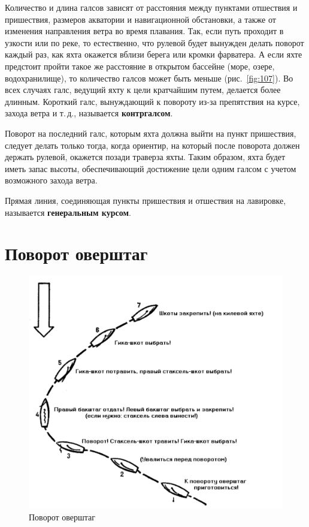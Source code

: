 \documentclass[a4paper, 12pt, twoside, final]{scrbook}
\begin{document}
Количество и длина галсов зависят от расстояния между пунктами отшествия и пришествия, размеров акватории и навигационной обстановки, а также от изменения направления ветра во время плавания. Так, если путь проходит в узкости или по реке, то естественно, что рулевой будет вынужден делать поворот каждый раз, как яхта окажется вблизи берега или кромки фарватера. А если яхте предстоит пройти такое же расстояние в открытом бассейне (море, озере, водохранилище), то количество галсов может быть меньше (рис.~\ref{fig:107}). Во всех случаях галс, ведущий яхту к цели кратчайшим путем, делается более длинным. Короткий галс, вынуждающий к повороту из-за препятствия на курсе, захода ветра и т.\,д., называется \textbf{контргалсом}.

Поворот на последний галс, которым яхта должна выйти на пункт пришествия, следует делать только тогда, когда ориентир, на который после поворота должен держать рулевой, окажется позади траверза яхты. Таким образом, яхта будет иметь запас высоты, обеспечивающий достижение цели одним галсом с учетом возможного захода ветра.

Прямая линия, соединяющая пункты пришествия и отшествия на лавировке, называется \textbf{генеральным курсом}.

\section{Поворот оверштаг}

\begin{figure}[htbp]
   \centering
   \includegraphics{108_Povorot_overshtag} %
   \caption{Поворот оверштаг}
   \label{fig:108}
\end{figure}
\end{document}
